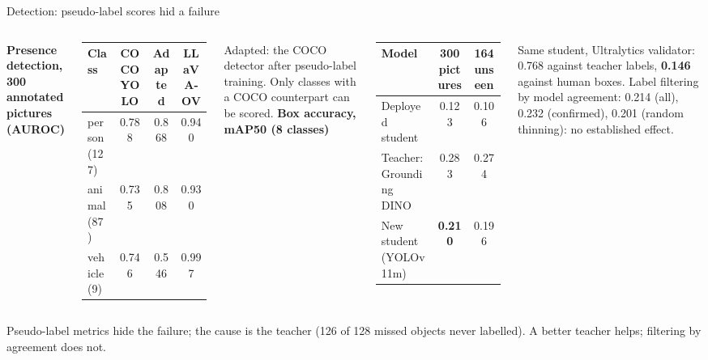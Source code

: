 \documentclass[aspectratio=169,10pt]{beamer}
\newcommand{\takeaway}[1]{\vfill\begin{keybox}#1\end{keybox}}
\begin{document}
\begin{frame}{Detection: pseudo-label scores hid a failure}
\begin{columns}[T,onlytextwidth]
\textbf{\color{navy}Presence detection, 300 annotated pictures (AUROC)}\par\vspace{2pt}
\footnotesize\renewcommand{\arraystretch}{1.18}
\begin{tabular}{@{}l c c c@{}}
\toprule
Class & COCO YOLO & Adapted & LLaVA-OV\\
\midrule
person (127) & 0.788 & 0.868 & 0.940\\
animal (87) & 0.735 & 0.808 & 0.930\\
vehicle (9) & 0.746 & 0.546 & 0.997\\
\bottomrule
\end{tabular}\par\vspace{2pt}
{\scriptsize\color{muted}Adapted: the COCO detector after pseudo-label training. Only classes with a COCO counterpart can be scored.}
\textbf{\color{navy}Box accuracy, mAP50 (8 classes)}\par\vspace{2pt}
\footnotesize\renewcommand{\arraystretch}{1.18}
\begin{tabular}{@{}l c c@{}}
\toprule
Model & 300 pictures & 164 unseen\\
\midrule
Deployed student & 0.123 & 0.106\\
Teacher: Grounding DINO & 0.283 & 0.274\\
New student (YOLOv11m) & \textbf{0.210} & 0.196\\
\bottomrule
\end{tabular}\par\vspace{3pt}
{\scriptsize Same student, Ultralytics validator: 0.768 against teacher labels, \textbf{0.146} against human boxes. Label filtering by model agreement: 0.214 (all), 0.232 (confirmed), 0.201 (random thinning): no established effect.}
\end{columns}
\takeaway{Pseudo-label metrics hide the failure; the cause is the teacher (126 of 128 missed objects never labelled). A better teacher helps; filtering by agreement does not.}
\end{frame}
\end{document}
